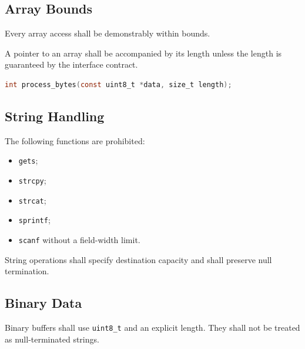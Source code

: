 \subsection{Array Bounds}

Every array access shall be demonstrably within bounds.

A pointer to an array shall be accompanied by its length unless the length is guaranteed by the interface contract.

\begin{lstlisting}[language=C]
int process_bytes(const uint8_t *data, size_t length);
\end{lstlisting}

\subsection{String Handling}

The following functions are prohibited:

\begin{itemize}
	\item \texttt{gets};
	\item \texttt{strcpy};
	\item \texttt{strcat};
	\item \texttt{sprintf};
	\item \texttt{scanf} without a field-width limit.
\end{itemize}

String operations shall specify destination capacity and shall preserve null termination.

\subsection{Binary Data}

Binary buffers shall use \texttt{uint8\_t} and an explicit length. They shall not be treated as null-terminated strings.
